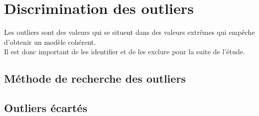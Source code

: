 \section{Discrimination des outliers}
Les outliers sont des valeurs qui se situent dans des valeurs extrêmes qui empêche d'obtenir un modèle cohérent.\\
Il est donc important de les identifier et de les exclure pour la suite de l'étude.

\subsection{Méthode de recherche des outliers}



\subsection{Outliers écartés}

